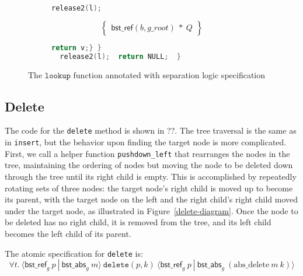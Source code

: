 \documentclass[runningheads]{llncs}
\newcommand{\treerep}{\ensuremath{\mathsf{bst\_abs}}}
\newcommand{\nodeboxrep}{\ensuremath{\mathsf{bst\_ref}}}
\begin{document}
{\begin{figure}[htp]
\begin{subfigure}[t]{1\textwidth}
        \begin{lstlisting}[language = C,  numbers = none]
      release2(l);
         \end{lstlisting}
       $$\left\{\begin{array}{l} \nodeboxrep(b,g\_root)\ *\ Q\end{array}\right\}$$
         \begin{lstlisting}[language = C, numbers = none]
       return v;} }
  release2(l);  return NULL;  }
 \end{lstlisting} 
\end{subfigure}
\caption{The $\texttt{lookup}$ function annotated with separation logic specification}
\label{lookupproof}
\end{figure} }

\subsection{Delete}

The code for the \lstinline{delete} method is shown in ??. %
The tree traversal is the same as in \lstinline{insert}, but the behavior upon finding the target node is more complicated. First, we call a helper function \lstinline{pushdown_left} that rearranges the nodes in the tree, maintaining the ordering of nodes but moving the node to be deleted down through the tree until its right child is empty. This is accomplished by repeatedly rotating sets of three nodes: the target node's right child is moved up to become its parent, with the target node on the left and the right child's right child moved under the target node, as illustrated in Figure~\ref{delete-diagram}.
Once the node to be deleted has no right child, it is removed from the tree, and its left child becomes the left child of its parent.

The atomic specification for \lstinline{delete} is:
$$\forall t.\ \langle \nodeboxrep_g\ p\ |\ \treerep_g\ m\rangle\ \texttt{delete}(p, k)\ \langle \nodeboxrep_g\ p\ |\ \treerep_g\ (\mathrm{abs\_delete}\ m\ k)\rangle$$
\end{document}
